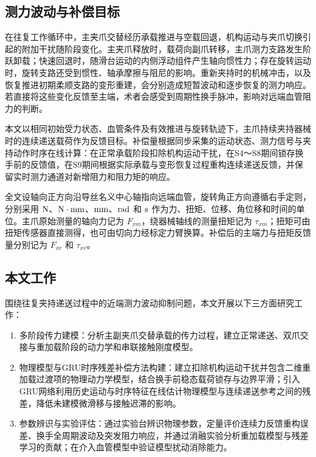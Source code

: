 \documentclass{JQRnew}
\begin{document}
\subsection{测力波动与补偿目标}

在往复工作循环中，主夹爪交替经历承载推进与空载回退，机构运动与夹爪切换引起的附加干扰随阶段变化。主夹爪释放时，载荷向副爪转移，主爪测力支路发生阶跃卸载；快速回退时，随滑台运动的内侧浮动组件产生轴向惯性力；存在旋转运动时，旋转支路还受到惯性、轴承摩擦与阻尼的影响。重新夹持时的机械冲击，以及恢复推进初期柔顺支路的变形重建，会分别造成短暂波动和逐步恢复的测力响应。若直接将这些变化反馈至主端，术者会感受到周期性换手脉冲，影响对远端血管阻力的判断。

本文以相同初始受力状态、血管条件及有效推进与旋转轨迹下，主爪持续夹持器械时的连续递送载荷作为反馈目标。补偿量根据同步采集的运动状态、测力信号与夹持动作时序在线计算：在正常承载阶段扣除机构运动干扰，在S4～S8期间锁存换手前的反馈值，在S9期间根据实际承载与变形恢复过程重构连续递送反馈，并保留实时测力通道对新增阻力和阻力矩的响应。

全文设轴向正方向沿导丝名义中心轴指向远端血管，旋转角正方向遵循右手定则，分别采用 ${\rm N}$、${\rm N}\cdot{\rm mm}$、${\rm mm}$、${\rm rad}$ 和 ${\rm s}$ 作为力、扭矩、位移、角位移和时间的单位。主爪原始测量的轴向力记为 $F_{xm}$，绕器械轴线的测量扭矩记为 $\tau_{xm}$；扭矩可由扭矩传感器直接测得，也可由切向力经标定力臂换算。补偿后的主端力与扭矩反馈量分别记为 $F_{xc}$ 和 $\tau_{xc}$。

\subsection{本文工作}

围绕往复夹持递送过程中的近端测力波动抑制问题，本文开展以下三方面研究工作：
\begin{enumerate}
\item[1)] 多阶段传力建模：分析主副夹爪交替承载的传力过程，建立正常递送、双爪交接与重加载阶段的动力学和串联接触刚度模型。
\item[2)] 物理模型与GRU时序残差补偿方法构建：建立扣除机构运动干扰并包含二维重加载过渡项的物理动力学模型，结合换手前稳态载荷锁存与边界平滑；引入GRU网络利用历史运动与时序特征在线估计物理模型与连续递送参考之间的残差，降低未建模微滑移与接触迟滞的影响。
\item[3)] 参数辨识与实验评估：通过实验台辨识物理参数，定量评价连续力反馈重构误差、换手全周期波动及突发阻力响应，并通过消融实验分析重加载模型与残差学习的贡献；在介入血管模型中验证模型扰动消除能力。
\end{enumerate}
\end{document}
